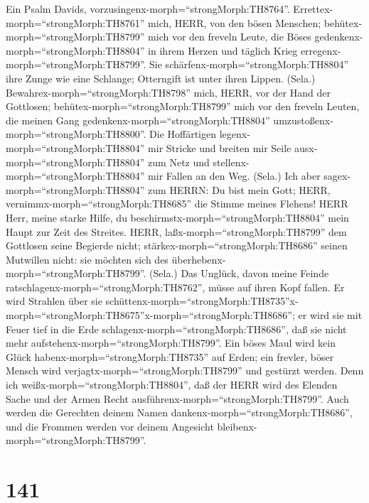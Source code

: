  Ein Psalm Davids,
vorzusingenx-morph=``strongMorph:TH8764''.
Errettex-morph=``strongMorph:TH8761'' mich, HERR, von den bösen
Menschen; behütex-morph=``strongMorph:TH8799'' mich vor den freveln
Leute,  die Böses gedenkenx-morph=``strongMorph:TH8804'' in
ihrem Herzen und täglich Krieg erregenx-morph=``strongMorph:TH8799''.
 Sie schärfenx-morph=``strongMorph:TH8804'' ihre Zunge wie
eine Schlange; Otterngift ist unter ihren Lippen. (Sela.) 
Bewahrex-morph=``strongMorph:TH8798'' mich, HERR, vor der Hand der
Gottlosen; behütex-morph=``strongMorph:TH8799'' mich vor den freveln
Leuten, die meinen Gang gedenkenx-morph=``strongMorph:TH8804''
umzustoßenx-morph=``strongMorph:TH8800''.  Die Hoffärtigen
legenx-morph=``strongMorph:TH8804'' mir Stricke und breiten mir Seile
ausx-morph=``strongMorph:TH8804'' zum Netz und
stellenx-morph=``strongMorph:TH8804'' mir Fallen an den Weg. (Sela.)
 Ich aber sagex-morph=``strongMorph:TH8804'' zum HERRN: Du
bist mein Gott; HERR, vernimmx-morph=``strongMorph:TH8685'' die Stimme
meines Flehens!  HERR Herr, meine starke Hilfe, du
beschirmstx-morph=``strongMorph:TH8804'' mein Haupt zur Zeit des
Streites.  HERR, laßx-morph=``strongMorph:TH8799'' dem
Gottlosen seine Begierde nicht; stärkex-morph=``strongMorph:TH8686''
seinen Mutwillen nicht: sie möchten sich des
überhebenx-morph=``strongMorph:TH8799''. (Sela.)  Das
Unglück, davon meine Feinde ratschlagenx-morph=``strongMorph:TH8762'',
müsse auf ihren Kopf fallen.  Er wird Strahlen über sie
schüttenx-morph=``strongMorph:TH8735''\textbar x-morph=``strongMorph:TH8675''x-morph=``strongMorph:TH8686'';
er wird sie mit Feuer tief in die Erde
schlagenx-morph=``strongMorph:TH8686'', daß sie nicht mehr
aufstehenx-morph=``strongMorph:TH8799''.  Ein böses Maul
wird kein Glück habenx-morph=``strongMorph:TH8735'' auf Erden; ein
frevler, böser Mensch wird verjagtx-morph=``strongMorph:TH8799'' und
gestürzt werden.  Denn ich
weißx-morph=``strongMorph:TH8804'', daß der HERR wird des Elenden Sache
und der Armen Recht ausführenx-morph=``strongMorph:TH8799''.
 Auch werden die Gerechten deinem Namen
dankenx-morph=``strongMorph:TH8686'', und die Frommen werden vor deinem
Angesicht bleibenx-morph=``strongMorph:TH8799''.

\hypertarget{section-140}{%
\section{141}\label{section-140}}

